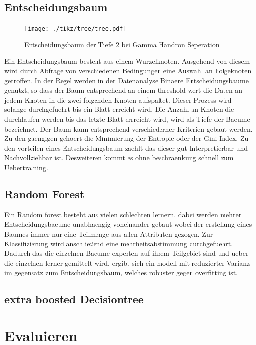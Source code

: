 \subsection{Entscheidungsbaum}
\begin{figure}
  \texttt{[image: ./tikz/tree/tree.pdf]}
  \caption{Entscheidungsbaum der Tiefe 2 bei Gamma Handron Seperation}
\end{figure}
Ein Entscheidungsbaum besteht aus einem Wurzelknoten. Ausgehend von diesem wird durch Abfrage von verschiedenen Bedingungen eine Auswahl an Folgeknoten getroffen. In der Regel werden in der Datenanalyse Binaere Entscheidungsbaume genutzt, so dass der Baum entsprechend an einem threshold wert die Daten an jedem Knoten in die zwei folgenden Knoten aufspaltet. Dieser Prozess wird solange durchgefuehrt bis ein Blatt erreicht wird. Die Anzahl an Knoten die durchlaufen werden bis das letzte Blatt errreicht wird, wird als Tiefe der Baeume bezeichnet.
Der Baum kann entsprechend verschiederner Kriterien gebaut werden. Zu den gaengigen gehoert die Minimierung der Entropie oder der Gini-Index. 
Zu den vorteilen eines Entscheidungsbaum zaehlt das dieser gut Interpretierbar und Nachvollziehbar ist. Desweiteren kommt es ohne beschraenkung schnell zum Uebertraining.
\subsection{Random Forest}
Ein Random forest besteht aus vielen schlechten lernern. dabei werden mehrer Entscheidungsbaeume unabhaengig voneinander gebaut wobei der erstellung eines Baumes immer nur eine Teilmenge aus allen Attributen gezogen. Zur Klassifizierung wird anschließend eine mehrheitsabstimmung durchgefuehrt. Dadurch das die einzelnen Baeume experten auf ihrem Teilgebiet sind und ueber die einzelnen lerner gemittelt wird, ergibt sich ein modell mit reduzierter Varianz im gegensatz zum Entscheidungsbaum, welches robuster gegen overfitting ist.
\subsection{extra boosted Decisiontree}

\section{Evaluieren}

